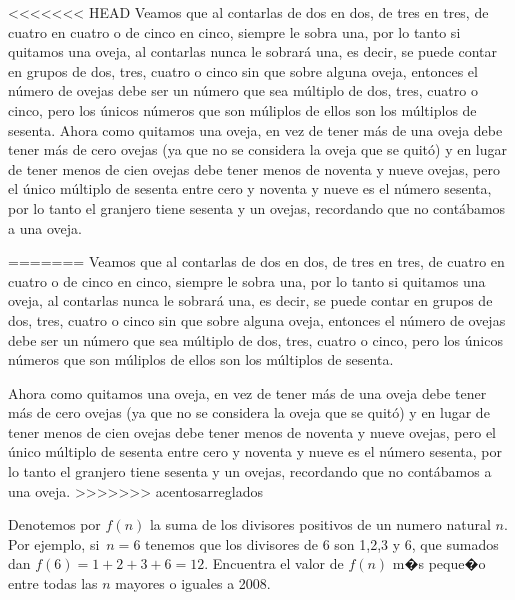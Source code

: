 \begin{Solucion}
<<<<<<< HEAD
  Veamos que al contarlas de dos en dos, de tres en tres, de cuatro en cuatro o de cinco en cinco,
siempre le sobra una, por lo tanto si quitamos una oveja, al contarlas nunca le sobrar\'a una, es decir,
se puede contar en grupos de dos, tres, cuatro o cinco sin que sobre alguna oveja, entonces el n\'umero de ovejas
debe ser un n\'umero que sea m\'ultiplo de dos, tres, cuatro o cinco, pero los \'unicos n\'umeros que son m\'uliplos de
ellos son los m\'ultiplos de sesenta.
  Ahora como quitamos una oveja, en vez de tener m\'as de una oveja debe tener m\'as de cero ovejas (ya que no se
considera la oveja que se quit\'o) y en lugar de tener menos de cien ovejas debe tener menos de noventa y nueve ovejas,
pero el \'unico m\'ultiplo de sesenta entre cero y noventa y nueve es el n\'umero sesenta, por lo tanto el granjero tiene
sesenta y un ovejas, recordando que no cont\'abamos a una oveja.

=======
  Veamos que al contarlas de dos en dos, de tres en tres, de cuatro en
  cuatro o de cinco en cinco, siempre le sobra una, por lo tanto si
  quitamos una oveja, al contarlas nunca le sobrar\'a una, es decir,
  se puede contar en grupos de dos, tres, cuatro o cinco sin que sobre
  alguna oveja, entonces el n\'umero de ovejas debe ser un n\'umero
  que sea m\'ultiplo de dos, tres, cuatro o cinco, pero los \'unicos
  n\'umeros que son m\'uliplos de ellos son los m\'ultiplos de
  sesenta.

  Ahora como quitamos una oveja, en vez de tener m\'as de una oveja
  debe tener m\'as de cero ovejas (ya que no se considera la oveja que
  se quit\'o) y en lugar de tener menos de cien ovejas debe tener
  menos de noventa y nueve ovejas, pero el \'unico m\'ultiplo de
  sesenta entre cero y noventa y nueve es el n\'umero sesenta, por lo
  tanto el granjero tiene sesenta y un ovejas, recordando que no
  cont\'abamos a una oveja.
>>>>>>> acentosarreglados
\end{Solucion}

\begin{Problema}{3}
  Denotemos por $f(n)$ la suma de los divisores positivos de un numero
  natural $n$. Por ejemplo, si~$n=6$ tenemos que los divisores de 6
  son 1,2,3 y 6, que sumados dan $f(6)=1+2+3+6=12$. Encuentra el valor
  de $f(n)$ m�s peque�o entre todas las $n$ mayores o iguales a 2008.
\end{Problema}

\begin{Solucion}
  
\end{Solucion}

